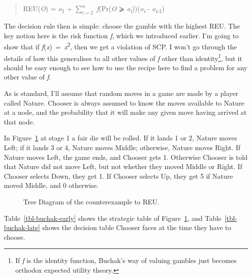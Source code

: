 \documentclass[
  10pt,
  letterpaper,
  DIV=11,
  numbers=noendperiod,
  twoside]{scrartcl}
\begin{document}
\begin{quote}
REU(\emph{O}) = \emph{o}\textsubscript{1} + \(\sum_{i = 2}^n\)
\emph{f}(Pr(\emph{O} ⩾
\emph{o\textsubscript{i}}))(\emph{o\textsubscript{i}} -
\emph{o}\textsubscript{\emph{i}-1})
\end{quote}

The decision rule then is simple: choose the gamble with the highest
REU. The key notion here is the risk function \emph{f}, which we
introduced earlier. I'm going to show that if
\emph{f}(\emph{x})~=~\emph{x}\textsuperscript{2}, then we get a
violation of SCP. I won't go through the details of how this generalises
to all other values of \emph{f} other than identity\footnote{If \emph{f}
  is the identity function, Buchak's way of valuing gambles just becomes
  orthodox expected utility theory.}, but it should be easy enough to
see how to use the recipe here to find a problem for any other value of
\emph{f}.

As is standard, I'll assume that random moves in a game are made by a
player called Nature. Chooser is always assumed to know the moves
available to Nature at a node, and the probability that it will make any
given move having arrived at that node.

In Figure~\ref{fig-buchak} at stage 1 a fair die will be rolled. If it
lands 1 or 2, Nature moves Left; if it lands 3 or 4, Nature moves
Middle; otherwise, Nature moves Right. If Nature moves Left, the game
ends, and Chooser gets 1. Otherwise Chooser is told that Nature did not
move Left, but not whether they moved Middle or Right. If Chooser
selects Down, they get 1. If Chooser selects Up, they get 5 if Nature
moved Middle, and 0 otherwise.

\begin{figure}


\caption{\label{fig-buchak}Tree Diagram of the counterexample to REU.}

\end{figure}%

Table~\ref{tbl-buchak-early} shows the strategic table of
Figure~\ref{fig-buchak}, and Table~\ref{tbl-buchak-late} shows the
decision table Chooser faces at the time they have to choose.
\end{document}
